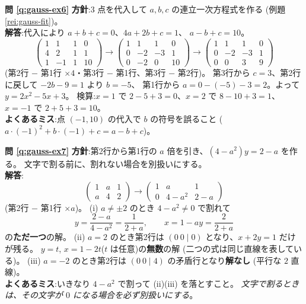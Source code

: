 \bigskip
\noindent\textbf{問 \ref{q:gauss-ex6}}\quad
\textbf{方針}:$3$ 点を代入して $a, b, c$ の連立一次方程式を作る
(例題 \ref{rei:gauss-fit})。\\
\textbf{解答}:代入により $a + b + c = 0$、$4a + 2b + c = 1$、
$a - b + c = 10$。
\[
\left(\begin{array}{ccc|c}
1 & 1 & 1 & 0 \\
4 & 2 & 1 & 1 \\
1 & -1 & 1 & 10
\end{array}\right)
\longrightarrow
\left(\begin{array}{ccc|c}
1 & 1 & 1 & 0 \\
0 & -2 & -3 & 1 \\
0 & -2 & 0 & 10
\end{array}\right)
\longrightarrow
\left(\begin{array}{ccc|c}
1 & 1 & 1 & 0 \\
0 & -2 & -3 & 1 \\
0 & 0 & 3 & 9
\end{array}\right)
\]
(第2行 $-$ 第1行 $\times 4$・第3行 $-$ 第1行、第3行 $-$ 第2行)。
第3行から $c = 3$、第2行に戻して $-2b - 9 = 1$ より $b = -5$、
第1行から $a = 0 - (-5) - 3 = 2$。よって $y = 2x^2 - 5x + 3$。
検算:$x = 1$ で $2 - 5 + 3 = 0$、$x = 2$ で $8 - 10 + 3 = 1$、
$x = -1$ で $2 + 5 + 3 = 10$。\\
\textbf{よくあるミス}:点 $(-1, 10)$ の代入で $b$ の符号を誤ること
($a \cdot (-1)^2 + b \cdot (-1) + c = a - b + c$)。

\bigskip
\noindent\textbf{問 \ref{q:gauss-ex7}}\quad
\textbf{方針}:第2行から第1行の $a$ 倍を引き、$(4 - a^2)y = 2 - a$ を作る。
文字で割る前に、割れない場合を別扱いにする。\\
\textbf{解答}:
\[
\left(\begin{array}{cc|c}
1 & a & 1 \\
a & 4 & 2
\end{array}\right)
\longrightarrow
\left(\begin{array}{cc|c}
1 & a & 1 \\
0 & 4 - a^2 & 2 - a
\end{array}\right)
\]
(第2行 $-$ 第1行 $\times a$)。
(i) $a \neq \pm 2$ のとき $4 - a^2 \neq 0$ で割れて
\[
y = \frac{2 - a}{4 - a^2} = \frac{1}{2 + a}, \qquad
x = 1 - ay = \frac{2}{2 + a}
\]
の\textbf{ただ一つ}の解。
(ii) $a = 2$ のとき第2行は $(0\ 0 \mid 0)$ となり、$x + 2y = 1$ だけが残る。
$y = t$, $x = 1 - 2t$($t$ は任意)の\textbf{無数}の解
(二つの式は同じ直線を表している)。
(iii) $a = -2$ のとき第2行は $(0\ 0 \mid 4)$ の矛盾行となり\textbf{解なし}
(平行な $2$ 直線)。\\
\textbf{よくあるミス}:いきなり $4 - a^2$ で割って (ii)(iii) を落とすこと。
\emph{文字で割るときは、その文字が $0$ になる場合を必ず別扱いにする}。


